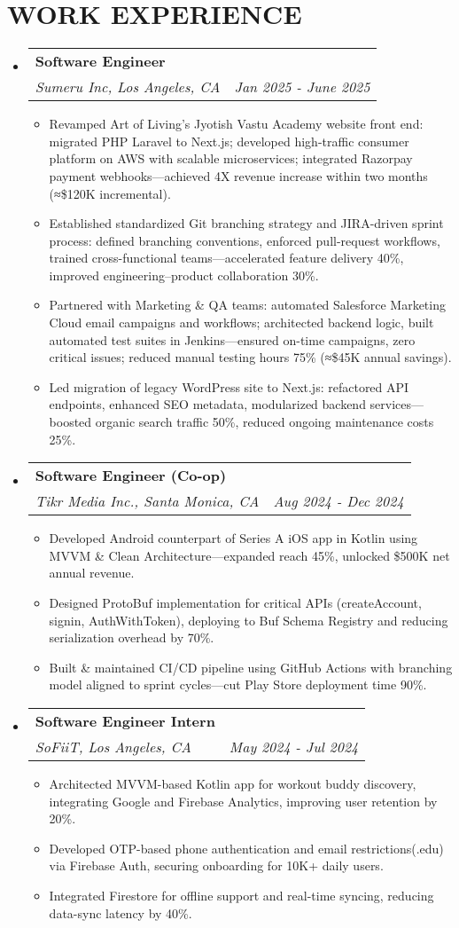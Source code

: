 \documentclass[letterpaper,11pt]{article}
\makeatletter
\newcommand{\resumeItem}[1]{
  \item\small{
    {#1 \vspace{-1pt}}
  }
}
\newcommand{\resumeSubheading}[4]{
  \vspace{-2pt}\item
    \begin{tabular*}{1.0\textwidth}[t]{l@{\extracolsep{\fill}}r}
      \textbf{\large#1} & \textbf{\small #2} \\
      \textit{\large#3} & \textit{\small #4} \\
      
    \end{tabular*}\vspace{-7pt}
}
\newcommand{\resumeSubHeadingListStart}{\begin{itemize}[leftmargin=0.0in, label={}]}
\newcommand{\resumeSubHeadingListEnd}{\end{itemize}}
\newcommand{\resumeItemListStart}{\begin{itemize}[leftmargin=0.1in]}
\newcommand{\resumeItemListEnd}{\end{itemize}\vspace{-5pt}}
\makeatother
\begin{document}
\section{\color{airforceblue}WORK EXPERIENCE}
  \resumeSubHeadingListStart

    \resumeSubheading
      {Software Engineer}{} 
      {Sumeru Inc, Los Angeles, CA}{Jan 2025 - June 2025}
      \resumeItemListStart
            \resumeItem{\normalsize{Revamped Art of Living's Jyotish Vastu Academy website front end: migrated PHP Laravel to Next.js; developed high-traffic consumer platform on AWS with scalable microservices; integrated Razorpay payment webhooks---achieved 4X revenue increase within two months (≈\$120K incremental).}}
            \resumeItem{\normalsize{Established standardized Git branching strategy and JIRA-driven sprint process: defined branching conventions, enforced pull-request workflows, trained cross-functional teams---accelerated feature delivery 40\%, improved engineering--product collaboration 30\%.}}  
            \resumeItem{\normalsize{Partnered with Marketing \& QA teams: automated Salesforce Marketing Cloud email campaigns and workflows; architected backend logic, built automated test suites in Jenkins---ensured on-time campaigns, zero critical issues; reduced manual testing hours 75\% (≈\$45K annual savings).}}
            \resumeItem{\normalsize{Led migration of legacy WordPress site to Next.js: refactored API endpoints, enhanced SEO metadata, modularized backend services---boosted organic search traffic 50\%, reduced ongoing maintenance costs 25\%.}}  
      \resumeItemListEnd  

    \resumeSubheading
      {Software Engineer (Co-op)}{} 
      {Tikr Media Inc., Santa Monica, CA}{Aug 2024 - Dec 2024}
      \resumeItemListStart
            \resumeItem{\normalsize{Developed Android counterpart of Series A iOS app in Kotlin using MVVM \& Clean Architecture---expanded reach 45\%, unlocked \$500K net annual revenue.}}
            \resumeItem{\normalsize{Designed ProtoBuf implementation for critical APIs (createAccount, signin, AuthWithToken), deploying to Buf Schema Registry and reducing serialization overhead by 70\%.}}  
            \resumeItem{\normalsize{Built \& maintained CI/CD pipeline using GitHub Actions with branching model aligned to sprint cycles---cut Play Store deployment time 90\%.}}  
      \resumeItemListEnd  

    \resumeSubheading
      {Software Engineer Intern}{} 
      {SoFiiT, Los Angeles, CA}{May 2024 - Jul 2024}
      \resumeItemListStart
            \resumeItem{\normalsize{Architected MVVM-based Kotlin app for workout buddy discovery, integrating Google and Firebase Analytics, improving user retention by 20\%.}}
            \resumeItem{\normalsize{Developed OTP-based phone authentication and email restrictions(.edu) via Firebase Auth, securing onboarding for 10K+ daily users.}}  
            \resumeItem{\normalsize{Integrated Firestore for offline support and real-time syncing, reducing data-sync latency by 40\%.}}  
      \resumeItemListEnd  
  \resumeSubHeadingListEnd
\vspace{-1pt}
\end{document}
